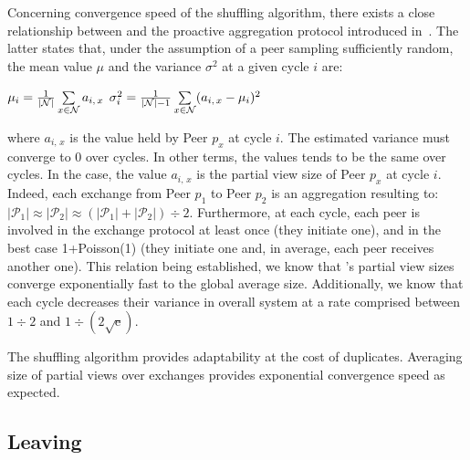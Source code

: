 Concerning convergence speed of the shuffling algorithm, there exists
a close relationship between \SPRAY and the proactive aggregation
protocol introduced
in~\cite{jelasity2004epidemic,montresor2004robust}. The latter states
that, under the assumption of a peer sampling sufficiently random, the
mean value $\mu$ and the variance $\sigma^2$ at a given cycle $i$ are:
\begin{center}
  $\mu_i = {1\over{|\mathcal{N}|}} \sum\limits_{x \in \mathcal{N}} a_{i,\,x}$
  \hfill
  $\sigma^2_i = {1\over{|\mathcal{N}|-1}}\sum\limits_{x \in \mathcal{N}}
  (a_{i,\,x} - \mu_i)^2$
\end{center}
where $a_{i,\,x}$ is the value held by Peer $p_x$ at cycle $i$. The estimated
variance must converge to $0$ over cycles. In other terms, the values tends to
be the same over cycles. In the \SPRAY case, the value $a_{i,\,x}$ is the
partial view size of Peer $p_x$ at cycle $i$. Indeed, each exchange from Peer
$p_1$ to Peer $p_2$ is an aggregation resulting to:
$|\mathcal{P}_1|\approx|\mathcal{P}_2|\approx{(|\mathcal{P}_1| +
  |\mathcal{P}_2|) \div 2}$.
Furthermore, at each cycle, each peer is involved in the exchange protocol at
least once (they initiate one), and in the best case 1+Poisson(1) (they
initiate one and, in average, each peer receives another one). This relation
being established, we know that \SPRAY's partial view sizes converge
exponentially fast to the global average size. Additionally, we know that each
cycle decreases their variance in overall system at a rate comprised between
${1\div 2}$ and $1\div ({2\sqrt{\text{e}}})$.

The shuffling algorithm provides adaptability at the cost of
duplicates. Averaging size of partial views over exchanges provides
exponential convergence speed as expected.

\subsection{Leaving}
\label{subsec:leaving}

